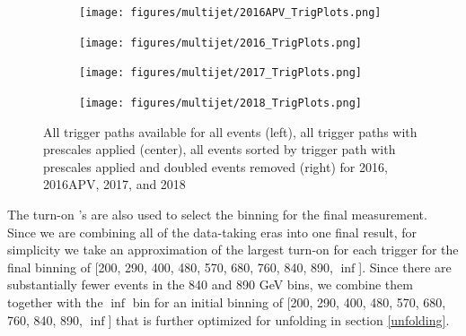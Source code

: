 \begin{figure}[h!]
  \begin{subfigure}
	\centering
	\texttt{[image: figures/multijet/2016APV\_TrigPlots.png]}
\end{subfigure}
\begin{subfigure}
	\centering
	\texttt{[image: figures/multijet/2016\_TrigPlots.png]}
\end{subfigure}
\begin{subfigure}
	\centering
	\texttt{[image: figures/multijet/2017\_TrigPlots.png]}
\end{subfigure}
\begin{subfigure}
	\centering
	\texttt{[image: figures/multijet/2018\_TrigPlots.png]}
\end{subfigure}
	\caption{All trigger paths available for all events (left), all trigger paths with prescales applied (center), all events sorted by trigger path with prescales applied and doubled events removed (right) for 2016, 2016APV, 2017, and 2018}
	\label{fig:trigstitch}
      \end{figure}
The turn-on \pt's are also used to select the \pt binning for the final measurement. Since we are combining all of the data-taking eras into one final result, for simplicity we take an approximation of the largest turn-on \pt for each trigger for the final \pt binning of [200, 290, 400, 480, 570, 680, 760, 840, 890, $\inf$]. Since there are substantially fewer events in the 840 and 890 GeV bins, we combine them together with the $\inf$ bin for an initial \pt binning of  [200, 290, 400, 480, 570, 680, 760, 840, 890, $\inf$] that is further  optimized for unfolding in section \ref{unfolding}.
